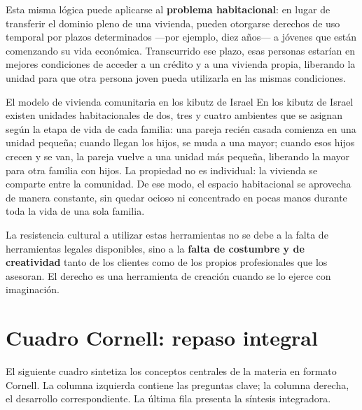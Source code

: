 \documentclass[12pt,oneside]{book}
\begin{document}
Esta misma lógica puede aplicarse al \textbf{problema habitacional}: en lugar de transferir el dominio pleno de una vivienda, pueden otorgarse derechos de uso temporal por plazos determinados ---por ejemplo, diez años--- a jóvenes que están comenzando su vida económica. Transcurrido ese plazo, esas personas estarían en mejores condiciones de acceder a un crédito y a una vivienda propia, liberando la unidad para que otra persona joven pueda utilizarla en las mismas condiciones.

\begin{example}{El modelo de vivienda comunitaria en los kibutz de Israel}
En los kibutz de Israel existen unidades habitacionales de dos, tres y cuatro ambientes que se asignan según la etapa de vida de cada familia: una pareja recién casada comienza en una unidad pequeña; cuando llegan los hijos, se muda a una mayor; cuando esos hijos crecen y se van, la pareja vuelve a una unidad más pequeña, liberando la mayor para otra familia con hijos. La propiedad no es individual: la vivienda se comparte entre la comunidad. De ese modo, el espacio habitacional se aprovecha de manera constante, sin quedar ocioso ni concentrado en pocas manos durante toda la vida de una sola familia.
\end{example}

La resistencia cultural a utilizar estas herramientas no se debe a la falta de herramientas legales disponibles, sino a la \textbf{falta de costumbre y de creatividad} tanto de los clientes como de los propios profesionales que los asesoran. El derecho es una herramienta de creación cuando se lo ejerce con imaginación.

\chapter{Cuadro Cornell: repaso integral}

El siguiente cuadro sintetiza los conceptos centrales de la materia en formato Cornell. La columna izquierda contiene las preguntas clave; la columna derecha, el desarrollo correspondiente. La última fila presenta la síntesis integradora.

\vspace{0.5em}
\end{document}
